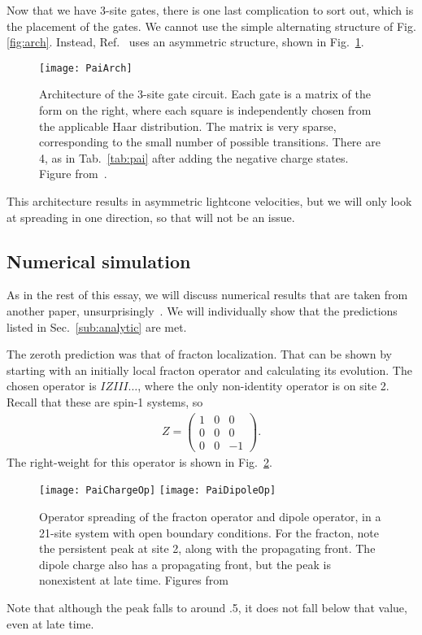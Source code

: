 \documentclass[a4paper,12pt]{article}
\newcommand{\note}[1]{{\color{red}{#1}}}
\begin{document}
Now that we have 3-site gates, there is one last complication to sort out, which is the placement of the gates. We cannot use the simple alternating structure of Fig.\ref{fig:arch}. Instead, Ref.~\cite{PaiFracton} uses an asymmetric structure, shown in Fig.~\ref{fig:PaiArch}.
\begin{figure}
	\centering
	\texttt{[image: PaiArch]}
	\caption{Architecture of the 3-site gate circuit. Each gate is a matrix of the form on the right, where each square is independently chosen from the applicable Haar distribution. The matrix is very sparse, corresponding to the small number of possible transitions. There are 4, as in Tab.~\ref{tab:pai} after adding the negative charge states. Figure from~\cite{PaiFracton}.}
	\label{fig:PaiArch}
\end{figure}
This architecture results in asymmetric lightcone velocities, but we will only look at spreading in one direction, so that will not be an issue.

\subsection{Numerical simulation} \label{sub:numeric}

As in the rest of this essay, we will discuss numerical results that are taken from another paper, unsurprisingly~\cite{PaiFracton}. We will individually show that the predictions listed in Sec.~\ref{sub:analytic} are met.

The zeroth prediction was that of fracton localization. That can be shown by starting with an initially local fracton operator and calculating its evolution. The chosen operator is $IZIII\dots$, where the only non-identity operator is on site 2. Recall that these are spin-1 systems, so 
\begin{align}
Z = \begin{pmatrix} 1 & 0 & 0 \\ 0 & 0 & 0 \\ 0 & 0 & -1 \end{pmatrix}.
\end{align}
The right-weight for this operator is shown in Fig.~\ref{fig:PaiChargeOp}.
\begin{figure}
	\centering
	\texttt{[image: PaiChargeOp]}
	\texttt{[image: PaiDipoleOp]}
	\caption{Operator spreading of the fracton operator and dipole operator, in a 21-site system with open boundary conditions. For the fracton, note the persistent peak at site 2, along with the propagating front. The dipole charge also has a propagating front, but the peak is nonexistent at late time. Figures from~\cite{PaiFracton}}
	\label{fig:PaiChargeOp}
\end{figure}
Note that although the peak falls to around .5, it does not fall below that value, even at late time. \note{Is this value significant?}
\end{document}
